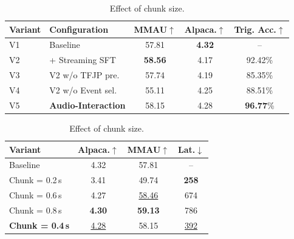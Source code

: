 \documentclass{article}
\begin{document}
\begin{table}[t]
\centering
\small
\begin{minipage}[t]{0.57\textwidth}
\centering
\setlength{\tabcolsep}{2pt}
\renewcommand{\arraystretch}{0.85}
\caption{Ablation on streaming model training.}
\label{tab:ablation_data}
\begin{tabular}{@{}llccc@{}}
\toprule
\textbf{Variant} & \textbf{Configuration} & \textbf{MMAU}$\uparrow$ & \textbf{Alpaca.}$\uparrow$ & \textbf{Trig. Acc.}$\uparrow$ \\
\midrule
V1 & Baseline       & 57.81 & \textbf{4.32} & --  \\
\midrule
\rowcolor{gray!15}
V2 & + Streaming SFT         & \textbf{58.56} & 4.17 & 92.42\%  \\
V3 & V2 w/o TFJP pre.        & 57.74 & 4.19 & 85.35\% \\
V4 & V2 w/o Event sel.       & 55.11 & 4.25 & 88.51\% \\
\midrule
\rowcolor{gray!15}
V5 & \textbf{Audio-Interaction} & 58.15 & 4.28 & \textbf{96.77}\% \\
\bottomrule
\end{tabular}
\end{minipage}
\hfill
\begin{minipage}[t]{0.39\textwidth}
\centering
\setlength{\tabcolsep}{2pt}
\renewcommand{\arraystretch}{0.85}
\caption{Effect of chunk size.}
\label{tab:ablation_chunk}
\begin{tabular}{@{}lccc@{}}
\toprule
\textbf{Variant} & \textbf{Alpaca.}$\uparrow$ & \textbf{MMAU}$\uparrow$ & \textbf{Lat.}$\downarrow$ \\
\midrule
Baseline             & 4.32 & 57.81 & -- \\
\midrule
Chunk = 0.2\,s       & 3.41 & 49.74 & \textbf{258} \\
Chunk = 0.6\,s       & 4.27 & \underline{58.46} & 674 \\
Chunk = 0.8\,s       & \textbf{4.30} & \textbf{59.13} & 786 \\
\midrule
\rowcolor{gray!15}
\textbf{Chunk = 0.4\,s} & \underline{4.28} & 58.15 & \underline{392} \\
\bottomrule
\end{tabular}
\end{minipage}
\vspace{-3mm}
\end{table}


\end{document}
